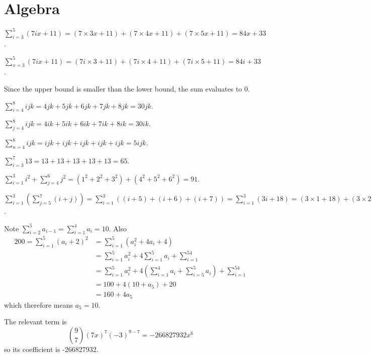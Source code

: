 \section{Algebra}
\begin{questions}
    \item \begin{partquestions}{\alph*}
        \item $\displaystyle \sum_{i=3}^{5}(7ix+11) = (7\times3x + 11) + (7\times4x + 11) + (7\times5x + 11) = 84x + 33$.
        \item $\displaystyle \sum_{x=3}^{5}(7ix+11) = (7i\times3 + 11) + (7i\times4 + 11) + (7i\times5 + 11) = 84i + 33$.
        \item Since the upper bound is smaller than the lower bound, the sum evaluates to 0.
        \item $\displaystyle \sum_{i=4}^{8}ijk = 4jk + 5jk + 6jk + 7jk + 8jk = 30jk$.
        \item $\displaystyle \sum_{j=4}^{8}ijk = 4ik + 5ik + 6ik + 7ik + 8ik = 30ik$.
        \item $\displaystyle \sum_{n=4}^{8}ijk = ijk + ijk + ijk + ijk + ijk = 5ijk$.
        \item $\displaystyle \sum_{i=3}^{7}13 = 13 + 13 + 13 + 13 + 13 = 65$.
        \item $\displaystyle \sum_{i=1}^{3}i^2 + \sum_{j=4}^{6}j^2 = (1^2 + 2^2 + 3^2) + (4^2 + 5^2 + 6^2) = 91$.
        \item $\displaystyle \sum_{i=1}^{3}\left(\sum_{j=5}^{7}(i+j)\right) = \sum_{i=1}^{3}\left((i+5) + (i+6) + (i+7)\right) = \sum_{i=1}^{3}\left(3i+18\right) = (3\times1 + 18) + (3\times2 + 18) + (3\times3 + 18) = 72$.
    \end{partquestions}

    \item Note $\displaystyle \sum_{i=2}^5a_{i-1} = \sum_{i=1}^4a_i = 10$. Also
    \begin{align*}
        200 = \sum_{i=1}^5(a_i+2)^2 &= \sum_{i=1}^5(a_i^2 + 4a_i + 4)\\
        &= \sum_{i=1}^5a_i^2 + 4\sum_{i=1}^5a_i + \sum_{i=1}^54\\
        &= \sum_{i=1}^5a_i^2 + 4\left(\sum_{i=1}^4a_i + \sum_{i=5}^5a_i\right) + \sum_{i=1}^54\\
        &= 100 + 4\left(10 + a_5\right) + 20\\
        &= 160 + 4a_5
    \end{align*}
    which therefore means $a_5 = 10$.

    \item The relevant term is
    \[
        {9 \choose 7}(7x)^7(-3)^{9-7} = -266827932x^6
    \]
    so its coefficient is -266827932.
\end{questions}

